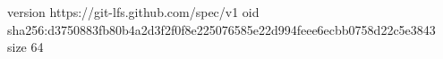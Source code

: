 version https://git-lfs.github.com/spec/v1
oid sha256:d3750883fb80b4a2d3f2f0f8e225076585e22d994feee6ecbb0758d22c5e3843
size 64
